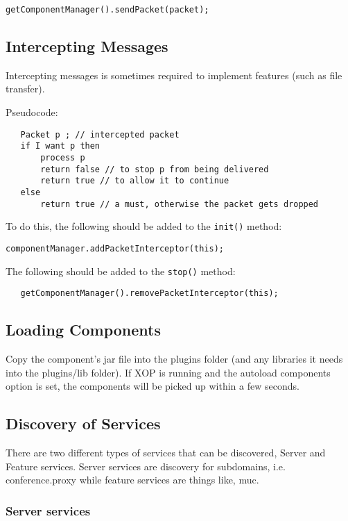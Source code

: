 \documentclass{article}
\newcommand{\code}[1]{\texttt{#1}}
\begin{document}
\begin{verbatim}
getComponentManager().sendPacket(packet);
\end{verbatim}

\subsection{Intercepting Messages}
Intercepting messages is sometimes required to implement features (such as file
transfer).

Pseudocode:


\begin{verbatim}
   Packet p ; // intercepted packet
   if I want p then
       process p
       return false // to stop p from being delivered
       return true // to allow it to continue
   else
       return true // a must, otherwise the packet gets dropped
\end{verbatim}

To do this, the following should be added to the \code{init()} method:

\begin{verbatim}
componentManager.addPacketInterceptor(this); 
\end{verbatim}

The following should be added to the \code{stop()} method:

\begin{verbatim}
   getComponentManager().removePacketInterceptor(this);
\end{verbatim}


\subsection{Loading Components}
Copy the component's jar file into the plugins folder (and any libraries it
needs into the plugins/lib folder). If XOP is running and the autoload
components option is set, the components will be picked up within a few
seconds.  

\subsection{Discovery of Services}
There are two different types of services that can be discovered, Server and Feature services. Server services are discovery for subdomains, i.e. conference.proxy while feature services are things like, muc. 

\subsubsection{Server services}
\end{document}
